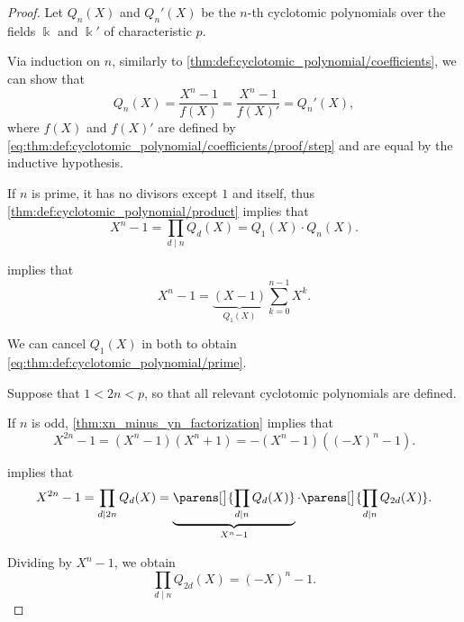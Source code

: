 \begin{proof}
   Let \( Q_n(X) \) and \( Q_n'(X) \) be the \( n \)-th cyclotomic polynomials over the fields \( \Bbbk \) and \( \Bbbk' \) of characteristic \( p \).

  Via induction on \( n \), similarly to \cref{thm:def:cyclotomic_polynomial/coefficients}, we can show that
  \begin{equation*}
    Q_n(X) = \frac {X^n - 1} {f(X)} = \frac {X^n - 1} {f(X)'} = Q_n'(X),
  \end{equation*}
  where \( f(X) \) and \( f(X)' \) are defined by \eqref{eq:thm:def:cyclotomic_polynomial/coefficients/proof/step} and are equal by the inductive hypothesis.

   If \( n \) is prime, it has no divisors except \( 1 \) and itself, thus \cref{thm:def:cyclotomic_polynomial/product} implies that
  \begin{equation*}
    X^n - 1 = \prod_{d \mid n} Q_d(X) = Q_1(X) \cdot Q_n(X).
  \end{equation*}

   implies that
  \begin{equation*}
    X^n - 1 = \underbrace{(X - 1)}_{Q_1(X)} \sum_{k=0}^{n-1} X^k.
  \end{equation*}

  We can cancel \( Q_1(X) \) in both to obtain \eqref{eq:thm:def:cyclotomic_polynomial/prime}.

   Suppose that \( 1 < 2n < p \), so that all relevant cyclotomic polynomials are defined.

  If \( n \) is odd, \cref{thm:xn_minus_yn_factorization} implies that
  \begin{equation*}
    X^{2n} - 1 = (X^n - 1) (X^n + 1) = -(X^n - 1) ((-X)^n - 1).
  \end{equation*}

   implies that
  \begin{equation*}
    X^{2n} - 1 = \prod_{d \mid 2n} Q_d(X) = \underbrace{\parens[\big]{ \prod_{d \mid n} Q_d(X) }}_{X^n - 1} \cdot \parens[\big]{ \prod_{d \mid n} Q_{2d}(X) }.
  \end{equation*}

  Dividing by \( X^n - 1 \), we obtain
  \begin{equation}\label{eq:thm:def:cyclotomic_polynomial/odd/proof/recurrence}
    \prod_{d \mid n} Q_{2d}(X) = (-X)^n - 1.
  \end{equation}


\end{proof}
